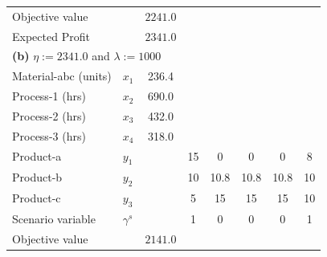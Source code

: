 \documentclass[7pt]{article}
\begin{document}
\begin{table}[h!]
\begin{tabular}{ll|c|ccccc}
        Objective value       &                                            & $2241.0$        &                                                                                     \\
        Expected Profit       &                                            & $2341.0$        &                                                                                     \\
        \midrule
        \multicolumn{8}{l}{\textbf{(b)} $\eta := 2341.0$ and $\lambda := 1000$}                                                                                                    \\
        \midrule
        Material-abc (units)  & $x_1$                                      & 236.4           &              &                   &               &                  &               \\
        Process-1 (hrs)       & $x_2$                                      & 690.0           &              &                   &               &                  &               \\
        Process-2 (hrs)       & $x_3$                                      & 432.0           &              &                   &               &                  &               \\
        Process-3 (hrs)       & $x_4$                                      & 318.0           &              &                   &               &                  &               \\
        Product-a             & $y_1$                                      &                 & 15           & 0                 & 0             & 0                & 8             \\
        Product-b             & $y_2$                                      &                 & 10           & 10.8              & 10.8          & 10.8             & 10            \\
        Product-c             & $y_3$                                      &                 & 5            & 15                & 15            & 15               & 10            \\
        Scenario variable     & $\gamma^s$                                 &                 & 1            & 0                 & 0             & 0                & 1             \\
        Objective value       &                                            & $2141.0$        &                                                                                     \\

\end{tabular}
\end{table}
\end{document}
